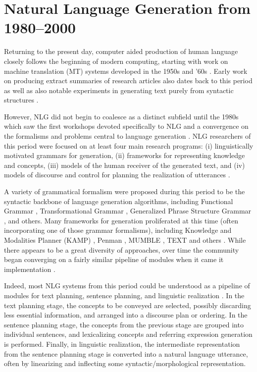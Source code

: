 \section{Natural Language Generation from 1980--2000}
  
Returning to the present day, computer aided production of human language
closely follows the beginning of modern computing, starting with work on
machine translation (MT) systems developed in the 1950s and '60s
\citep{ornstein1955mechanical,national1966language,hutchins2003machine}. Early
work on producing extract summaries of research articles also dates back to
this period \citep{luhn1958automatic} as well as  also notable experiments in
generating text purely from syntactic structures \citep{yngve1961random}.
  
However, NLG did not begin to coalesce as a distinct subfield until the 1980s
which saw the first workshops devoted specifically to NLG  and a convergence on
the formalisms and problems central to language generation
\citep{reiter1997building,mcdonald2010natural}.  NLG researchers of this period
were focused on at least four main research programs: (i) linguistically
motivated grammars for generation, (ii) frameworks for representing knowledge
and concepts, (iii) models of the human receiver of the generated text, and
(iv) models of discourse and control for planning the realization of utterances
\citep{mann1981text,mckeown1986}. 
    
A variety of grammatical formalism were proposed during this period to be the
syntactic backbone of language generation algorithms, including Functional
Grammar \citep{halliday2013halliday}, Transformational Grammar
\citep{chomsky1965aspects}, Generalized Phrase Structure Grammar
\citep{gazdar1985generalized}, and others. Many frameworks for generation
proliferated at this time (often incorporating one of those grammar
formalisms), including Knowledge and Modalities Planner (KAMP)
\citep{appelt1982planning}, Penman \citep{hovy1993natural}, MUMBLE
\citep{McDonald1981MUMBLEAF}, TEXT \citep{mckeown1982text} and others
\citep{mann1981text}.  While there appears to be a great diversity of
approaches, over time the community began converging on a fairly similar
pipeline of modules when it came it implementation \citep{reiter1994has}. 
  
Indeed, most NLG systems from this period could be understood as a pipeline of
modules for text planning, sentence planning, and linguistic realization
\citep{reiter1997building}.  In the text planning stage, the concepts to be
conveyed are selected, possibly discarding less essential information, and
arranged into a discourse plan or ordering. In the sentence planning stage, the
concepts from the previous stage are grouped into individual sentences, and
lexicalizing concepts and referring expression generation is performed.
Finally, in linguistic realization, the intermediate representation from the
sentence planning stage is converted into a natural language utterance, often
by linearizing and inflecting some syntactic/morphological representation.
  
